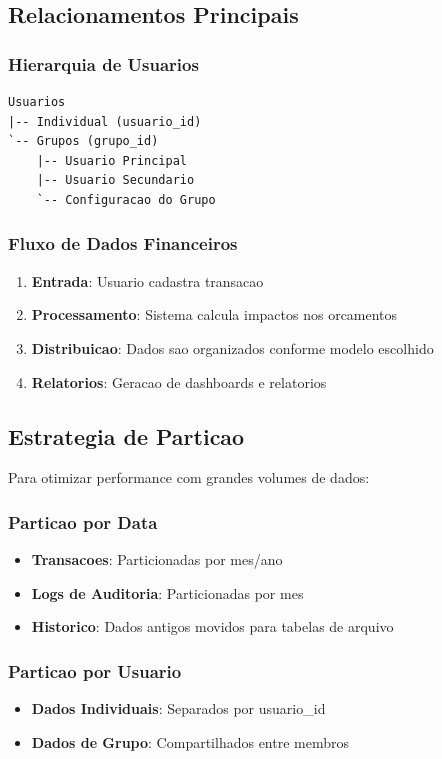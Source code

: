 \subsection{Relacionamentos Principais}

\subsubsection{Hierarquia de Usuarios}
\begin{lstlisting}[caption=Estrutura hierarquica de usuarios]
Usuarios
|-- Individual (usuario_id)
`-- Grupos (grupo_id)
    |-- Usuario Principal
    |-- Usuario Secundario
    `-- Configuracao do Grupo
\end{lstlisting}

\subsubsection{Fluxo de Dados Financeiros}
\begin{enumerate}
    \item \textbf{Entrada}: Usuario cadastra transacao
    \item \textbf{Processamento}: Sistema calcula impactos nos orcamentos
    \item \textbf{Distribuicao}: Dados sao organizados conforme modelo escolhido
    \item \textbf{Relatorios}: Geracao de dashboards e relatorios
\end{enumerate}

\subsection{Estrategia de Particao}

Para otimizar performance com grandes volumes de dados:

\subsubsection{Particao por Data}
\begin{itemize}
    \item \textbf{Transacoes}: Particionadas por mes/ano
    \item \textbf{Logs de Auditoria}: Particionadas por mes
    \item \textbf{Historico}: Dados antigos movidos para tabelas de arquivo
\end{itemize}

\subsubsection{Particao por Usuario}
\begin{itemize}
    \item \textbf{Dados Individuais}: Separados por usuario\_id
    \item \textbf{Dados de Grupo}: Compartilhados entre membros
\end{itemize}

